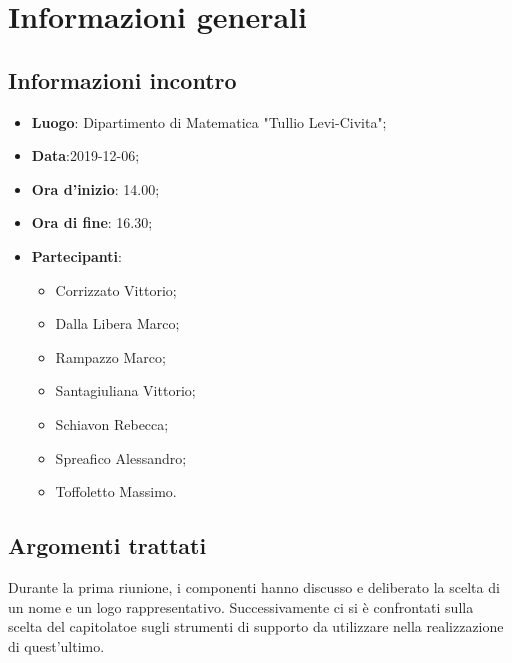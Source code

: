 \section{Informazioni generali}
    \subsection{Informazioni incontro}
        \begin{itemize}
            \item \textbf{Luogo}: Dipartimento di Matematica "Tullio Levi-Civita";
            \item \textbf{Data}:2019-12-06;
            \item \textbf{Ora d'inizio}: 14.00;
            \item \textbf{Ora di fine}: 16.30;
            \item \textbf{Partecipanti}: \begin{itemize}
                \item Corrizzato Vittorio;
                \item Dalla Libera Marco;
                \item Rampazzo Marco;
                \item Santagiuliana Vittorio;
                \item Schiavon Rebecca;
                \item Spreafico Alessandro;
                \item Toffoletto Massimo.
            \end{itemize}
        \end{itemize}
    \subsection{Argomenti trattati}
        Durante la prima riunione, i componenti hanno discusso e deliberato la scelta di un nome e un logo rappresentativo.
        Successivamente ci si è confrontati sulla scelta del capitolato\glo e sugli strumenti di supporto da utilizzare nella realizzazione
        di quest'ultimo.
